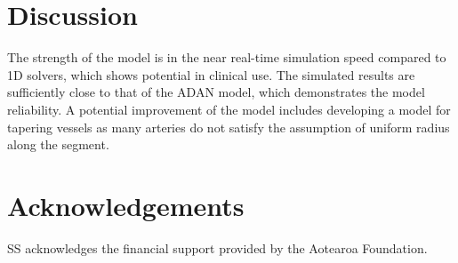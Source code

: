 \documentclass[fleqn,10pt]{physiome}
\begin{document}
\section{Discussion}

The strength of the model is in the near real-time simulation speed compared to 1D solvers, which shows potential in clinical use. The simulated results are sufficiently close to that of the ADAN model, which demonstrates the model reliability. A potential improvement of the model includes developing a model for tapering vessels as many arteries do not satisfy the assumption of uniform radius along the segment. 

\section{Acknowledgements}

SS acknowledges the financial support provided by the Aotearoa Foundation.


\end{document}

